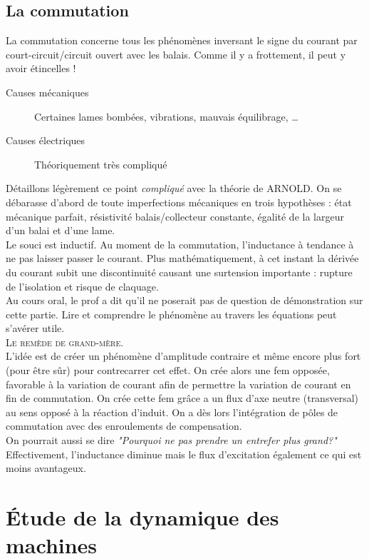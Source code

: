 	
	\subsection{La commutation}
	La commutation concerne tous les phénomènes inversant le signe du courant 
	par court-circuit/circuit ouvert avec les balais. Comme il y a frottement, 
	il peut y avoir étincelles !
	
	\begin{description}
	\item[Causes mécaniques] Certaines lames bombées, vibrations, mauvais 
	équilibrage, \dots
	\item[Causes électriques] Théoriquement très compliqué
	\end{description}
	Détaillons légèrement ce point \textit{compliqué} avec la théorie de ARNOLD. 
	On se débarasse d'abord de toute imperfections mécaniques en trois hypothèses :
	état mécanique parfait, résistivité balais/collecteur constante, égalité de 
	la largeur d'un balai et d'une lame.\\
	
	Le souci est inductif. Au moment de la commutation, l'inductance à tendance 
	à ne pas laisser passer le courant. Plus mathématiquement, à cet instant la 
	dérivée du courant subit une discontinuité causant une surtension importante : 
	rupture de l’isolation et risque de claquage.\\
	
	Au cours oral, le prof a dit qu'il ne poserait pas de question de démonstration sur cette partie. Lire et comprendre le phénomène au travers les équations peut s'avérer utile. \\
	
	\textsc{Le remède de grand-mère}.\\
	L'idée est de créer un phénomène d'amplitude 
	contraire et même encore plus fort (pour être sûr) pour contrecarrer cet 
	effet. On crée alors une fem opposée, favorable à la variation de courant afin 
	de permettre la variation de courant en fin de commutation. On crée cette fem 
	grâce a un flux d'axe neutre (transversal) au sens opposé à la réaction d'induit. On a dès lors l'intégration de pôles de commutation avec des enroulements de compensation. \\
	On pourrait aussi se dire \textit{"Pourquoi ne pas prendre un entrefer plus grand?"} 
	Effectivement, l'inductance diminue mais le flux d'excitation également ce qui 
	est moins avantageux. 
		

\section{Étude de la dynamique des machines}
